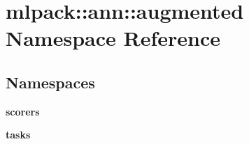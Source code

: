 \section{mlpack\+:\+:ann\+:\+:augmented Namespace Reference}
\label{namespacemlpack_1_1ann_1_1augmented}
\subsection*{Namespaces}
\begin{DoxyCompactItemize}
\item 
 \textbf{ scorers}
\item 
 \textbf{ tasks}
\end{DoxyCompactItemize}

